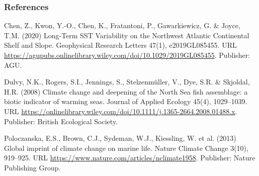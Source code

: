 \documentclass[11pt]{article}
\begin{document}
\subsubsection{References}
\begin{hangparas}{1em}{1}
Chen, Z., Kwon, Y.-O., Chen, K., Fratantoni, P., Gawarkiewicz, G. \& Joyce, T.M. (2020)
Long‐Term SST Variability on the Northwest Atlantic Continental Shelf and Slope. Geophysical Research Letters 47(1), e2019GL085455.
URL \url{https://agupubs.onlinelibrary.wiley.com/doi/10.1029/2019GL085455}. Publisher: AGU.

Dulvy, N.K., Rogers, S.I., Jennings, S., Stelzenmüller, V., Dye, S.R. \& Skjoldal, H.R. (2008)
Climate change and deepening of the North Sea fish assemblage: a biotic indicator of warming seas. Journal of Applied Ecology 45(4), 1029–1039.
URL \url{https://onlinelibrary.wiley.com/doi/10.1111/j.1365-2664.2008.01488.x}. Publisher: British Ecological Society.

Poloczanska, E.S., Brown, C.J., Sydeman, W.J., Kiessling, W. et al. (2013)
Global imprint of climate change on marine life. Nature Climate Change 3(10), 919–925.
URL \url{https://www.nature.com/articles/nclimate1958}. Publisher: Nature Publishing Group.

\end{hangparas}
\end{document}
